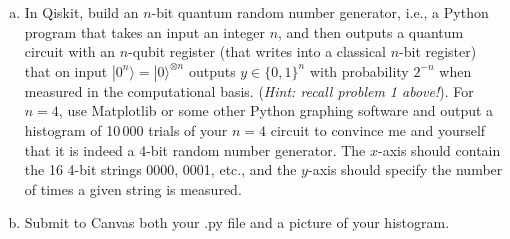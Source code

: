 \documentclass[10pt, cm]{article}
\renewcommand{\ket}[1]{|#1\rangle}		%
\begin{document}
\begin{enumerate}[(a)]
\item In Qiskit, build an $n$-bit quantum random number generator, i.e., a Python program that takes an input an integer $n$, and then outputs a quantum circuit with an $n$-qubit register (that writes into a classical $n$-bit register) that on input $\ket{0^n} = \ket{0}^{\otimes n}$ outputs $y \in \{0,1\}^{n}$ with probability $2^{-n}$ when measured in the computational basis. (\emph{Hint: recall problem 1 above!}). For $n = 4$, use Matplotlib or some other Python graphing software and output a histogram of 10\,000 trials of your $n=4$ circuit to convince me and yourself that it is indeed a 4-bit random number generator. The $x$-axis should contain the 16 4-bit strings 0000, 0001, etc., and the $y$-axis should specify the number of times a given string is measured.

\item Submit to Canvas both your .py file and a picture of your histogram.

\end{enumerate}

\clearpage
\end{document}
